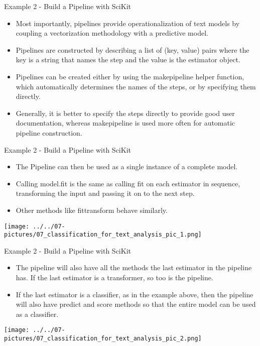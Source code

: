 \documentclass[11pt]{beamer}
\begin{document}
\begin{frame}{Example 2 - Build a Pipeline with SciKit}
	\begin{itemize}
		\item Most importantly, pipelines provide operationalization of text models by coupling a vectorization methodology with a predictive model. 
		\item Pipelines are constructed by describing a list of (key, value) pairs where the key is a string that names the step and the value is the estimator object. 
		\item Pipelines can be created either by using the make\textunderscore pipeline helper function, which automatically determines the names of the steps, or by specifying them directly. 
		\item Generally, it is better to specify the steps directly to provide good user documentation, whereas make\textunderscore pipeline is used more often for automatic pipeline construction.
	\end{itemize}
\end{frame}
\begin{frame}{Example 2 - Build a Pipeline with SciKit}
	\begin{itemize}
		\item The Pipeline can then be used as a single instance of a complete model. 
		\item Calling model.fit is the same as calling fit on each estimator in sequence, transforming the input and passing it on to the next step. 
		\item Other methods like fit\textunderscore  transform behave similarly. 
	\end{itemize}
	\begin{center}
	\texttt{[image: ../../07-pictures/07\_classification\_for\_text\_analysis\_pic\_1.png]}
	\end{center}
\end{frame}
\begin{frame}{Example 2 - Build a Pipeline with SciKit}
	\begin{itemize}
		\item The pipeline will also have all the methods the last estimator in the pipeline has. If the last estimator is a transformer, so too is the pipeline. 
		\item If the last estimator is a classifier, as in the example above, then the pipeline will also have predict and score methods so that the entire model can be used as a classifier.
	\end{itemize}
	\begin{center}
	\texttt{[image: ../../07-pictures/07\_classification\_for\_text\_analysis\_pic\_2.png]}
	\end{center}
\end{frame}
\end{document}
